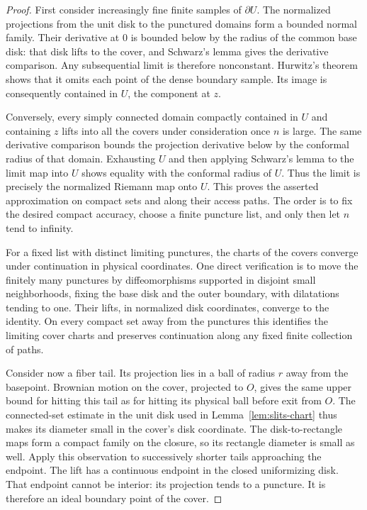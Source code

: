 \begin{proof}
First consider increasingly fine finite samples of $\partial U$.
The normalized projections from the unit disk to the punctured
domains form a bounded normal family.  Their derivative at $0$ is
bounded below by the radius of the common base disk: that disk lifts
to the cover, and Schwarz's lemma gives the derivative comparison.
Any subsequential limit is therefore nonconstant.  Hurwitz's theorem
shows that it omits each point of the dense boundary sample.  Its
image is consequently contained in $U$, the component at $z$.

Conversely, every simply connected domain compactly contained in
$U$ and containing $z$ lifts into all the covers under consideration
once $n$ is large.  The same derivative comparison bounds the
projection derivative below by the conformal radius of that domain.
Exhausting $U$ and then applying Schwarz's lemma to the limit map
into $U$ shows equality with the conformal radius of $U$.  Thus the
limit is precisely the normalized Riemann map onto $U$.  This proves
the asserted approximation on compact sets and along their access
paths.  The order is to fix the desired compact accuracy, choose
a finite puncture list, and only then let $n$ tend to infinity.

For a fixed list with distinct limiting punctures, the charts of
the covers converge under continuation in physical coordinates.
One direct verification is to move the finitely many punctures by
diffeomorphisms supported in disjoint small neighborhoods, fixing
the base disk and the outer boundary, with dilatations tending to
one.  Their lifts, in normalized disk coordinates, converge to the
identity.  On every compact set away from the punctures this
identifies the limiting cover charts and preserves continuation
along any fixed finite collection of paths.

Consider now a fiber tail.  Its projection lies in a ball of radius
$r$ away from the basepoint.  Brownian motion on the cover, projected
to $O$, gives the same upper bound for hitting this tail as for
hitting its physical ball before exit from $O$.  The connected-set
estimate in the unit disk used in Lemma~\ref{lem:slits-chart} thus
makes its diameter small in the cover's disk coordinate.  The
disk-to-rectangle maps form a compact family on the closure, so
its rectangle diameter is small as well.  Apply this observation
to successively shorter tails approaching the endpoint.  The lift
has a continuous endpoint in the closed uniformizing disk.  That
endpoint cannot be interior: its projection tends to a puncture.
It is therefore an ideal boundary point of the cover.


\end{proof}
